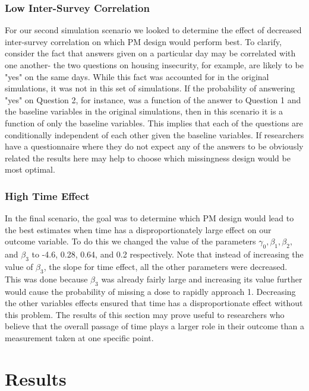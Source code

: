 \documentclass{svjour3}                     %
\begin{document}
\subsubsection{Low Inter-Survey Correlation}
For our second simulation scenario we looked to determine the effect of decreased inter-survey correlation on which PM design would perform best. To clarify, consider the fact that answers given on a particular day may be correlated with one another- the two questions on housing insecurity, for example, are likely to be "yes" on the same days. While this fact was accounted for in the original simulations, it was not in this set of simulations. If the probability of answering "yes" on Question 2, for instance, was a function of the answer to Question 1 and the baseline variables in the original simulations, then in this scenario it is a function of only the baseline variables. This implies that each of the questions are conditionally independent of each other given the baseline variables. If researchers have a questionnaire where they do not expect any of the answers to be obviously related the results here may help to choose which missingness design would be most optimal. \par
\subsubsection{High Time Effect}
In the final scenario, the goal was to determine which PM design would lead to the best estimates when time has a disproportionately large effect on our outcome variable. To do this we changed the value of the parameters $\gamma_0, \beta_1, \beta_2,$ and $\beta_3$ to -4.6, 0.28, 0.64, and 0.2 respectively. Note that instead of increasing the value of $\beta_3$, the slope for time effect, all the other parameters were decreased. This was done because $\beta_3$ was already fairly large and increasing its value further would cause the probability of missing a dose to rapidly approach 1. Decreasing the other variables effects ensured that time has a disproportionate effect without this problem. The results of this section may prove useful to researchers who believe that the overall passage of time plays a larger role in their outcome than a measurement taken at one specific point. \par

\section{Results}
\label{sec:3}
\end{document}
